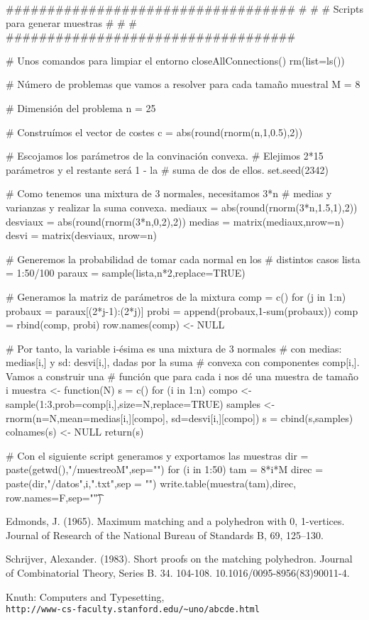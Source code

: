 \documentclass[twoside,a4paper,openright,12pt]{book}
\begin{document}
\begin{erre}
###################################
#                                 #
#  Scripts para generar muestras  #
#                                 #
###################################

# Unos comandos para limpiar el entorno
closeAllConnections()
rm(list=ls())

# Número de problemas que vamos a resolver para cada tamaño muestral
M = 8

# Dimensión del problema
n = 25

# Construímos el vector de costes
c = abs(round(rnorm(n,1,0.5),2))

# Escojamos los parámetros de la convinación convexa.
# Elejimos 2*15 parámetros y el restante será 1 - la 
# suma de dos de ellos.
set.seed(2342)

# Como tenemos una mixtura de 3 normales, necesitamos 3*n
# medias y varianzas y realizar la suma convexa.
mediaux = abs(round(rnorm(3*n,1.5,1),2))
desviaux = abs(round(rnorm(3*n,0,2),2))
medias = matrix(mediaux,nrow=n)
desvi = matrix(desviaux, nrow=n)

# Generemos la probabilidad de tomar cada normal en los
# distintos casos
lista = 1:50/100
paraux = sample(lista,n*2,replace=TRUE)

# Generamos la matriz de parámetros de la mixtura
comp = c()
for (j in 1:n) {
  probaux = paraux[(2*j-1):(2*j)]
  probi = append(probaux,1-sum(probaux))
  comp = rbind(comp, probi)
}
row.names(comp) <- NULL

# Por tanto, la variable i-ésima es una mixtura de 3 normales 
# con medias: medias[i,] y sd: desvi[i,], dadas por la suma 
# convexa con componentes comp[i,]. Vamos a construir una 
# función que para cada i nos dé una muestra de tamaño i
muestra <- function(N){
  s = c()
  for (i in 1:n){
    compo <- sample(1:3,prob=comp[i,],size=N,replace=TRUE)
    samples <- rnorm(n=N,mean=medias[i,][compo],
                     sd=desvi[i,][compo])
    s = cbind(s,samples)  }
  colnames(s) <- NULL
  return(s)}

# Con el siguiente script generamos y exportamos las muestras
dir = paste(getwd(),"/muestreoM",sep="")
for (i in 1:50) {
  tam = 8*i*M
  direc = paste(dir,"/datos",i,".txt",sep = "")
  write.table(muestra(tam),direc, row.names=F,sep="\t")
  }
\end{erre}

\begin{thebibliography}{9}
Edmonds, J. (1965). Maximum matching and a polyhedron with 0, 1-vertices. Journal of Research of the National Bureau of Standards B, 69, 125--130. 

 
Schrijver, Alexander. (1983). Short proofs on the matching polyhedron. Journal of Combinatorial Theory, Series B. 34. 104-108. 10.1016/0095-8956(83)90011-4. 
 
Knuth: Computers and Typesetting,
\\\texttt{http://www-cs-faculty.stanford.edu/\~{}uno/abcde.html}
\end{thebibliography}
\end{document}
